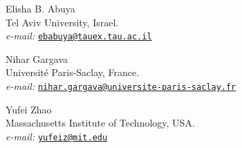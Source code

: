 \documentclass[11pt]{article}
\theoremstyle{remark}
\begin{document}
\medskip
\noindent
Elisha B. Abuya\\
Tel Aviv University, Israel.\\
\textit{e-mail:} \href{mailto:ebabuya@tauex.tau.ac.il}{\texttt{ebabuya@tauex.tau.ac.il}}

\medskip
\noindent
Nihar Gargava\\
Universit\'e Paris-Saclay, France.\\
\textit{e-mail:} \href{mailto:nihar.gargava@universite-paris-saclay.fr}{\texttt{nihar.gargava@universite-paris-saclay.fr}}

\medskip
\noindent
Yufei Zhao\\
Massachusetts Institute of Technology, USA.\\
\textit{e-mail:} \href{mailto:yufeiz@mit.edu}{\texttt{yufeiz@mit.edu}}
\end{document}
